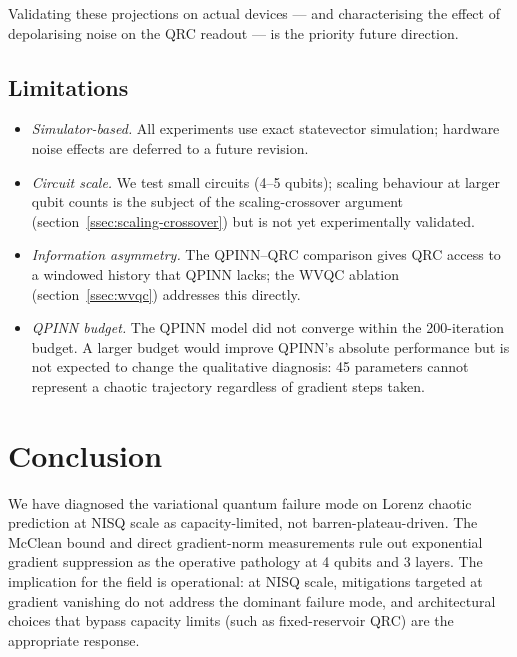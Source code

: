 \documentclass[a4paper,12pt]{iopart}
\begin{document}
Validating these projections on actual devices --- and characterising
the effect of depolarising noise on the QRC readout --- is the
priority future direction.

\subsection{Limitations}
\label{sec:limitations}

\begin{itemize}
  \item \textit{Simulator-based.} All experiments use exact statevector
        simulation; hardware noise effects are deferred to a future
        revision.
  \item \textit{Circuit scale.} We test small circuits (4--5 qubits);
        scaling behaviour at larger qubit counts is the subject of the
        scaling-crossover argument
        (section~\ref{ssec:scaling-crossover}) but is not yet
        experimentally validated.
  \item \textit{Information asymmetry.} The QPINN--QRC comparison
        gives QRC access to a windowed history that QPINN lacks; the
        WVQC ablation (section~\ref{ssec:wvqc}) addresses this directly.
  \item \textit{QPINN budget.} The QPINN model did not converge within
        the 200-iteration budget. A larger budget would improve QPINN's
        absolute performance but is not expected to change the
        qualitative diagnosis: 45 parameters cannot represent a
        chaotic trajectory regardless of gradient steps taken.
\end{itemize}

\section{Conclusion}

We have diagnosed the variational quantum failure mode on Lorenz
chaotic prediction at NISQ scale as capacity-limited, not
barren-plateau-driven. The McClean bound and direct gradient-norm
measurements rule out exponential gradient suppression as the
operative pathology at 4 qubits and 3 layers. The implication for the
field is operational: at NISQ scale, mitigations targeted at gradient
vanishing do not address the dominant failure mode, and architectural
choices that bypass capacity limits (such as fixed-reservoir QRC) are
the appropriate response.
\end{document}
